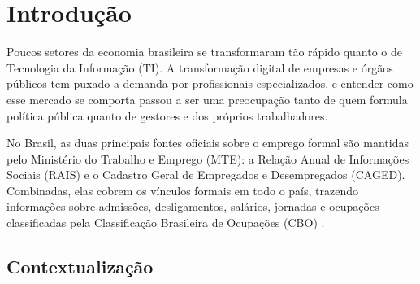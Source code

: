 
\chapter{Introdução}
\label{cap:introducao}

\begin{center}
\end{center}

\vspace{0.6em}

Poucos setores da economia brasileira se transformaram tão rápido quanto o de Tecnologia da Informação (TI). A transformação digital de empresas e órgãos públicos tem puxado a demanda por profissionais especializados, e entender como esse mercado se comporta passou a ser uma preocupação tanto de quem formula política pública quanto de gestores e dos próprios trabalhadores.

No Brasil, as duas principais fontes oficiais sobre o emprego formal são mantidas pelo Ministério do Trabalho e Emprego (MTE): a Relação Anual de Informações Sociais (RAIS) e o Cadastro Geral de Empregados e Desempregados (CAGED). Combinadas, elas cobrem os vínculos formais em todo o país, trazendo informações sobre admissões, desligamentos, salários, jornadas e ocupações classificadas pela Classificação Brasileira de Ocupações (CBO) \cite{RAIS2024, CAGED2024}.

\section{Contextualização}

